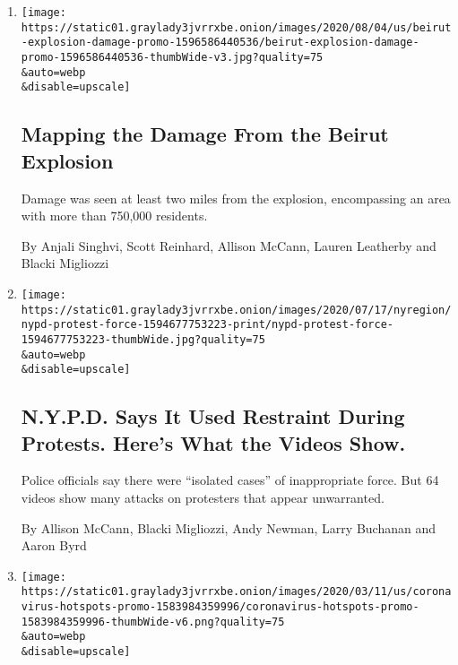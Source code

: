 \begin{enumerate}
\def\labelenumi{\arabic{enumi}.}
\item
  \href{/interactive/2020/08/04/world/middleeast/beirut-explosion-damage.html}{}

  \texttt{[image: https://static01.graylady3jvrrxbe.onion/images/2020/08/04/us/beirut-explosion-damage-promo-1596586440536/beirut-explosion-damage-promo-1596586440536-thumbWide-v3.jpg?quality=75\\\&auto=webp\\\&disable=upscale]}

  \hypertarget{mapping-the-damage-from-the-beirut-explosion}{%
  \subsection{Mapping the Damage From the Beirut
  Explosion}\label{mapping-the-damage-from-the-beirut-explosion}}

  Damage was seen at least two miles from the explosion, encompassing an
  area with more than 750,000 residents.

  By Anjali Singhvi, Scott Reinhard, Allison McCann, Lauren Leatherby
  and Blacki Migliozzi
\item
  \href{/interactive/2020/07/14/nyregion/nypd-george-floyd-protests.html}{}

  \texttt{[image: https://static01.graylady3jvrrxbe.onion/images/2020/07/17/nyregion/nypd-protest-force-1594677753223-print/nypd-protest-force-1594677753223-thumbWide.jpg?quality=75\\\&auto=webp\\\&disable=upscale]}

  \hypertarget{nypd-says-it-used-restraint-during-protests-heres-what-the-videos-show}{%
  \subsection{N.Y.P.D. Says It Used Restraint During Protests. Here's
  What the Videos
  Show.}\label{nypd-says-it-used-restraint-during-protests-heres-what-the-videos-show}}

  Police officials say there were ``isolated cases'' of inappropriate
  force. But 64 videos show many attacks on protesters that appear
  unwarranted.

  By Allison McCann, Blacki Migliozzi, Andy Newman, Larry Buchanan and
  Aaron Byrd
\item
  \href{/interactive/2020/world/coronavirus-maps-italy-iran-korea.html}{}

  \texttt{[image: https://static01.graylady3jvrrxbe.onion/images/2020/03/11/us/coronavirus-hotspots-promo-1583984359996/coronavirus-hotspots-promo-1583984359996-thumbWide-v6.png?quality=75\\\&auto=webp\\\&disable=upscale]}


\end{enumerate}
